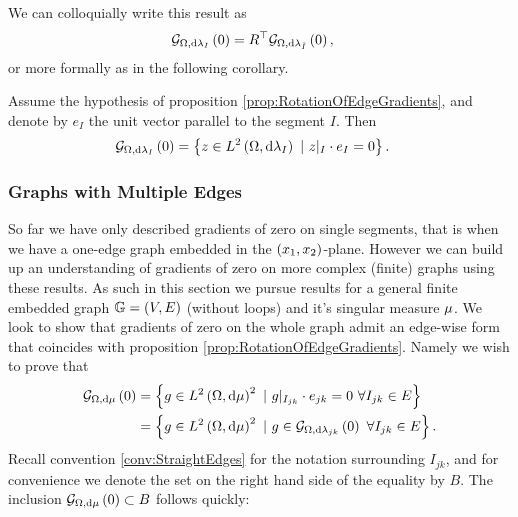 We can colloquially write this result as
\begin{align*}
	\mathcal{G}_{ \Omega, \mathrm{d}\lambda_I}\left( 0 \right) &= R^\top\mathcal{G}_{ \Omega, \mathrm{d}\lambda_{\tilde{I}}}\left( 0 \right),
\end{align*}
or more formally as in the following corollary.
\begin{cory} \label{cory:Grad0SingleEdge}
	Assume the hypothesis of proposition \ref{prop:RotationOfEdgeGradients}, and denote by $e_I$ the unit vector parallel to the segment $I$.
	Then
	\begin{align*}
		\mathcal{G}_{ \Omega, \mathrm{d}\lambda_I}\left( 0 \right) &= \left\{ z\in L^{2}\left( \Omega,\mathrm{d}\lambda_I \right) \ \vert \ z\vert_{I}\cdot e_I = 0 \right\}.
	\end{align*}
\end{cory}

\subsubsection{Graphs with Multiple Edges}
So far we have only described gradients of zero on single segments, that is when we have a one-edge graph embedded in the $\left( x_1,x_2 \right)$-plane.
However we can build up an understanding of gradients of zero on more complex (finite) graphs using these results.
As such in this section we pursue results for a general finite embedded graph $\mathbb{G} = \left( V,E \right)$ (without loops) and it's singular measure $\mu$.
We look to show that gradients of zero on the whole graph admit an edge-wise form that coincides with proposition \ref{prop:RotationOfEdgeGradients}.
Namely we wish to prove that
\begin{align*}
	\gradZero{\ddom}{\ddmes} &= \clbracs{g\in\ltwo{\ddom}{\ddmes}^2 \ \vert \ g\vert_{I_{jk}}\cdot e_{jk}=0 \ \forall I_{jk}\in E} \\
	&= \clbracs{g\in\ltwo{\ddom}{\ddmes}^2 \ \vert \ g\in\gradZero{\ddom}{\lambda_{jk}} \ \forall I_{jk}\in E}.
\end{align*}
Recall convention \ref{conv:StraightEdges} for the notation surrounding $I_{jk}$, and for convenience we denote the set on the right hand side of the equality by $B$.
The inclusion $\mathcal{G}_{ \Omega, \mathrm{d}\mu}\left( 0 \right) \subset B$ follows quickly:

